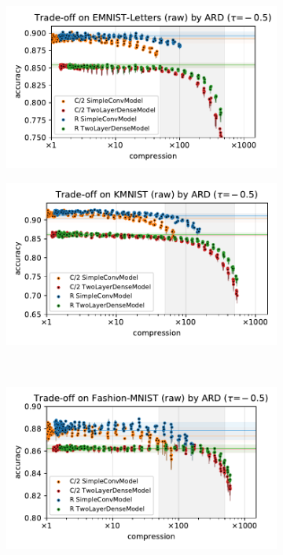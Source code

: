 \documentclass[a4paper,10pt,onecolumn]{article}
\begin{document}
\begin{figure}[b]
  \centering
  \begin{subfigure}[b]{0.5\columnwidth}
    \centering
    \includegraphics[width=\linewidth]{figure__mnist-like__trade-off/appendix__cmp__ARD__emnist_letters__raw__-0.5.pdf}
  \end{subfigure}%
  \begin{subfigure}[b]{0.5\columnwidth}
    \centering
    \includegraphics[width=\linewidth]{figure__mnist-like__trade-off/appendix__cmp__ARD__kmnist__raw__-0.5.pdf}
  \end{subfigure} \\%
  \begin{subfigure}[b]{0.5\columnwidth}
    \centering
    \includegraphics[width=\linewidth]{figure__mnist-like__trade-off/appendix__cmp__ARD__fashionmnist__raw__-0.5.pdf}

\end{subfigure}
\end{figure}
\end{document}

